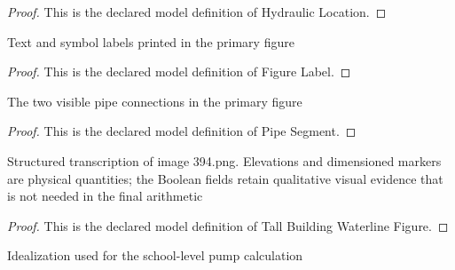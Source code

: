 \begin{proof}
  This is the declared model definition of Hydraulic Location.
\end{proof}
\begin{definition}
  \label{def:physics:phyx-mini-0394:phyxminiproblems-problemphyxmini0394-figurelabel}
  Text and symbol labels printed in the primary figure
\end{definition}
\begin{proof}
  This is the declared model definition of Figure Label.
\end{proof}
\begin{definition}
  \label{def:physics:phyx-mini-0394:phyxminiproblems-problemphyxmini0394-pipesegment}
  The two visible pipe connections in the primary figure
\end{definition}
\begin{proof}
  This is the declared model definition of Pipe Segment.
\end{proof}
\begin{definition}
  \label{def:physics:phyx-mini-0394:phyxminiproblems-problemphyxmini0394-tallbuildingwaterlinefigure}
  Structured transcription of image 394.png. Elevations and dimensioned markers are physical quantities; the Boolean fields retain qualitative visual evidence that is not needed in the final arithmetic
\end{definition}
\begin{proof}
  This is the declared model definition of Tall Building Waterline Figure.
\end{proof}
\begin{definition}
  \label{def:physics:phyx-mini-0394:phyxminiproblems-problemphyxmini0394-waterlineregime}
  Idealization used for the school-level pump calculation
\end{definition}
